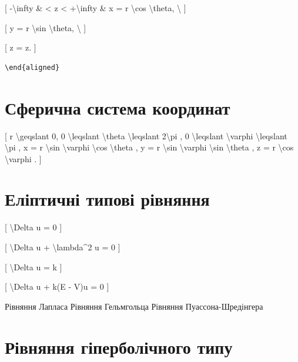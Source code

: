 \documentclass[
]{article}
\begin{document}
{[} -\textbackslash infty \& \textless{} z \textless{}
+\textbackslash infty \& x = r \textbackslash cos \textbackslash theta,
\textbackslash{} {]}

{[} y = r \textbackslash sin \textbackslash theta, \textbackslash{} {]}

{[} z = z. {]}

\begin{verbatim}
\end{aligned}
\end{verbatim}

\section{Сферична система
координат}\label{ux441ux444ux435ux440ux438ux447ux43dux430-ux441ux438ux441ux442ux435ux43cux430-ux43aux43eux43eux440ux434ux438ux43dux430ux442-1}

{[} r \textbackslash geqslant 0, 0 \textbackslash leqslant
\textbackslash theta \textbackslash leqslant 2\textbackslash pi , 0
\textbackslash leqslant \textbackslash varphi \textbackslash leqslant
\textbackslash pi , x = r \textbackslash sin \textbackslash varphi
\textbackslash cos \textbackslash theta , y = r \textbackslash sin
\textbackslash varphi \textbackslash sin \textbackslash theta , z = r
\textbackslash cos \textbackslash varphi . {]}

\section{Еліптичні типові
рівняння}\label{ux435ux43bux456ux43fux442ux438ux447ux43dux456-ux442ux438ux43fux43eux432ux456-ux440ux456ux432ux43dux44fux43dux43dux44f}

{[} \textbackslash Delta u = 0 {]}

{[} \textbackslash Delta u + \textbackslash lambda\^{}2 u = 0 {]}

{[} \textbackslash Delta u = k {]}

{[} \textbackslash Delta u + k(E - V)u = 0 {]}

Рівняння Лапласа Рівняння Гельмгольца Рівняння Пуассона-Шредінгера

\section{Рівняння гіперболічного
типу}\label{ux440ux456ux432ux43dux44fux43dux43dux44f-ux433ux456ux43fux435ux440ux431ux43eux43bux456ux447ux43dux43eux433ux43e-ux442ux438ux43fux443-1}
\end{document}

